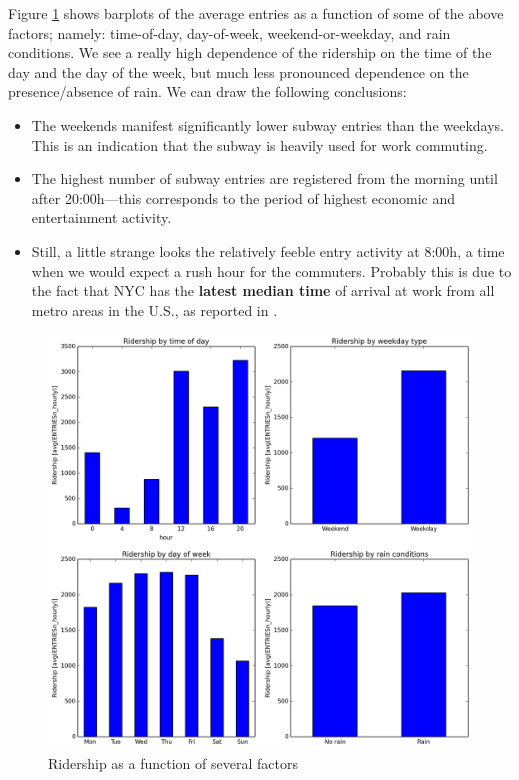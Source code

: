 \documentclass{article}
\begin{document}
Figure \ref{fig:barplots_h_dw_wd_rain} shows barplots of the average entries as a function of some of the above factors; namely: time-of-day, day-of-week, weekend-or-weekday, and rain conditions. We see a really high dependence of the ridership on the time of the day and the day of the week, but much less pronounced dependence on the presence/absence of rain. We can draw the following conclusions:
\begin{itemize}
\item The weekends manifest significantly lower subway entries than the weekdays. This is an indication that the subway is heavily used for work commuting.
\item The highest number of subway entries are registered from the morning until after 20:00h---this corresponds to the period of highest economic and entertainment activity. 
\item Still, a little strange looks the relatively feeble entry activity at 8:00h, a time when we would expect a rush hour for the commuters. Probably this is due to the fact that NYC has the \textbf{latest median time} of arrival at work from all metro areas in the U.S., as reported in \cite{cities_sleep}.  
\end{itemize}

\begin{figure}[ht]
\centering
\includegraphics[scale=0.6]{barplots_ridership_hour_wkd_dow_rain.png}
\caption{Ridership as a function of several factors}
\label{fig:barplots_h_dw_wd_rain}
\end{figure}
\end{document}
